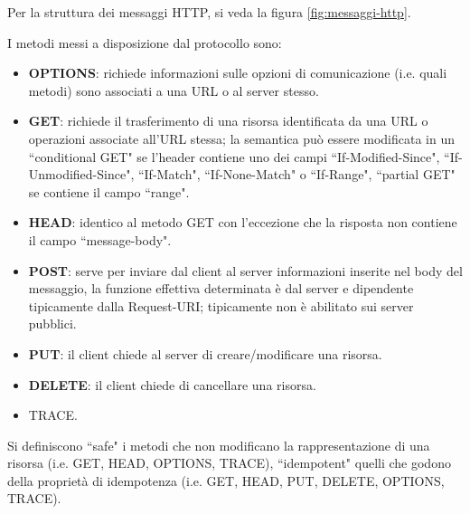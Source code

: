 \documentclass[11pt, italian, openany]{book}
\begin{document}
\begin{sloppypar}
\begin{itemize}[topsep=0pt, itemsep=0pt, parsep=0pt]
	Per la struttura dei messaggi HTTP, si veda la figura \ref{fig:messaggi-http}.

	I metodi messi a disposizione dal protocollo sono:
	\begin{itemize}[topsep=0pt, itemsep=0pt, parsep=0pt]
		\item \textbf{OPTIONS}: richiede informazioni sulle opzioni di comunicazione (i.e. quali metodi) sono associati a una URL o al server stesso.
		\item \textbf{GET}: richiede il trasferimento di una risorsa identificata da una URL o operazioni associate all’URL stessa; la semantica pu\`o
		essere modificata in un ``conditional GET" se l'header contiene uno dei campi ``If-Modified-Since", ``If-Unmodified-Since", ``If-Match",
		``If-None-Match" o ``If-Range", ``partial GET" se contiene il campo ``range".
		\item \textbf{HEAD}: identico al metodo GET con l'eccezione che la risposta non contiene il campo ``message-body".
		\item \textbf{POST}: serve per inviare dal client al server informazioni inserite nel body del messaggio, la funzione effettiva determinata \`e
		dal server e dipendente tipicamente dalla Request-URI; tipicamente non \`e abilitato sui server pubblici.
		\item \textbf{PUT}: il client chiede al server di creare/modificare una risorsa.
		\item \textbf{DELETE}: il client chiede di cancellare una risorsa.
		\item TRACE.
	\end{itemize}

	Si definiscono ``safe" i metodi che non modificano la rappresentazione di una risorsa (i.e. GET, HEAD, OPTIONS, TRACE), ``idempotent" quelli che godono
	della propriet\`a di idempotenza (i.e. GET, HEAD, PUT, DELETE, OPTIONS, TRACE).


\end{itemize}
\end{sloppypar}
\end{document}
